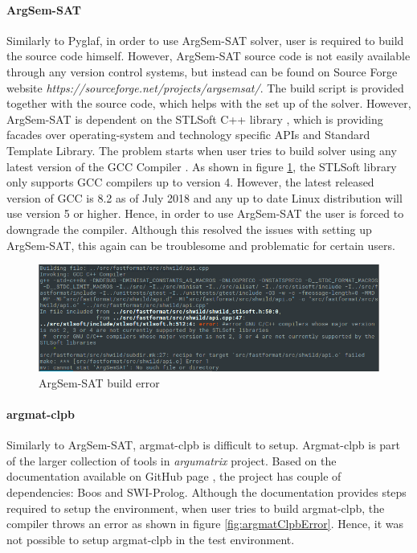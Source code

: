 \paragraph{ArgSem-SAT}
Similarly to Pyglaf, in order to use ArgSem-SAT solver, user is required to build the source code himself. However, ArgSem-SAT source code is not easily available through any version control systems, but instead can be found on Source Forge website \textit{https://sourceforge.net/projects/argsemsat/}. The build script is provided together with the source code, which helps with the set up of the solver. However, ArgSem-SAT is dependent on the STLSoft C++ library \citep{stlsoft}, which is providing facades over operating-system and technology specific APIs and Standard Template Library. The problem starts when user tries to build solver using any latest version of the GCC Compiler \citep{gcc}. As shown in figure \ref{fig:argsemsatBuildError}, the STLSoft library only supports GCC compilers up to version 4. However, the latest released version of GCC is 8.2 as of July 2018 \citep{gcc} and any up to date Linux distribution will use version 5 or higher. Hence, in order to use ArgSem-SAT the user is forced to downgrade the compiler. Although this resolved the issues with setting up ArgSem-SAT, this again can be troublesome and problematic for certain users.

\begin{figure}[h]
	\centering
	\includegraphics[width=\linewidth]{"img/argsemsat_error"}
	\caption{ArgSem-SAT build error}
	\label{fig:argsemsatBuildError}
\end{figure}

\paragraph{argmat-clpb}
Similarly to ArgSem-SAT, argmat-clpb \citep{argmat-clpb} is difficult to setup. Argmat-clpb is part of the larger collection of tools in \textit{argumatrix} project. Based on the documentation available on GitHub page \citep{argmat-clpbGithub}, the project has couple of dependencies: Boos and SWI-Prolog. Although the documentation provides steps required to setup the environment, when user tries to build argmat-clpb, the compiler throws an error as shown in figure \ref{fig:argmatClpbError}. Hence, it was not possible to setup argmat-clpb in the test environment.

